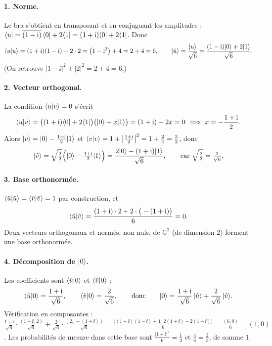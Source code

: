 \begin{correction}
\paragraph{1. Norme.} Le bra s'obtient en transposant et en conjuguant les amplitudes :
$\langle u|=\overline{(1-\mathrm{i})}\,\langle 0|+2\langle 1|=(1+\mathrm{i})\langle 0|+2\langle 1|$. Donc
\[
  \langle u|u\rangle=(1+\mathrm{i})(1-\mathrm{i})+2\cdot2=\big(1-\mathrm{i}^2\big)+4=2+4=6,
  \qquad
  |\hat u\rangle=\frac{|u\rangle}{\sqrt6}=\frac{(1-\mathrm{i})|0\rangle+2|1\rangle}{\sqrt6}.
\]
(On retrouve $|1-\ii|^2+|2|^2=2+4=6$.)

\paragraph{2. Vecteur orthogonal.} La condition $\langle u|v\rangle=0$ s'écrit
\[
  \langle u|v\rangle=\big((1+\mathrm{i})\langle 0|+2\langle 1|\big)\big(|0\rangle+x|1\rangle\big)=(1+\mathrm{i})+2x=0
  \ \Longrightarrow\ x=-\frac{1+\mathrm{i}}{2}.
\]
Alors $|v\rangle=|0\rangle-\frac{1+\mathrm{i}}{2}|1\rangle$ et
$\langle v|v\rangle=1+\big|\tfrac{1+\mathrm{i}}{2}\big|^2=1+\tfrac24=\tfrac32$, donc
\[
  |\hat v\rangle=\sqrt{\tfrac23}\Big(|0\rangle-\tfrac{1+\mathrm{i}}{2}|1\rangle\Big)
  =\frac{2|0\rangle-(1+\mathrm{i})|1\rangle}{\sqrt6},
  \qquad\text{car }\sqrt{\tfrac23}=\tfrac{2}{\sqrt6}.
\]

\paragraph{3. Base orthonormée.} $\langle \hat u|\hat u\rangle=\langle \hat v|\hat v\rangle=1$ par construction, et
\[
  \langle \hat u|\hat v\rangle=\frac{(1+\mathrm{i})\cdot2+2\cdot\big(-(1+\mathrm{i})\big)}{6}=0 .
\]
Deux vecteurs orthogonaux et normés, non nuls, de $\mathbb{C}^2$ (de dimension $2$) forment une
base orthonormée.

\paragraph{4. Décomposition de $|0\rangle$.} Les coefficients sont $\langle \hat u|0\rangle$ et
$\langle \hat v|0\rangle$ :
\[
  \langle \hat u|0\rangle=\frac{1+\mathrm{i}}{\sqrt6},\qquad
  \langle \hat v|0\rangle=\frac{2}{\sqrt6},
  \qquad\text{donc}\qquad
  |0\rangle=\frac{1+\mathrm{i}}{\sqrt6}\,|\hat u\rangle+\frac{2}{\sqrt6}\,|\hat v\rangle.
\]
Vérification en composantes :
$\frac{1+\ii}{\sqrt6}\cdot\frac{(1-\ii,\,2)}{\sqrt6}+\frac{2}{\sqrt6}\cdot\frac{(2,\,-(1+\ii))}{\sqrt6}
=\frac{\big((1+\ii)(1-\ii)+4,\ 2(1+\ii)-2(1+\ii)\big)}{6}=\frac{(6,0)}{6}=(1,0)$. Les probabilités de
mesure dans cette base sont
$\frac{|1+\ii|^2}{6}=\frac13$ et $\frac{4}{6}=\frac23$, de somme $1$.
\end{correction}

